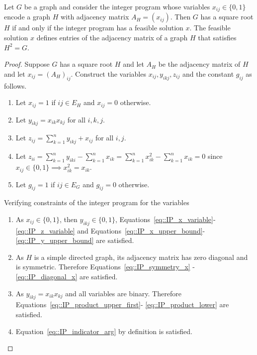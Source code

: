 
\begin{theorem} \label{theorem::IP_gives_root}
  Let $G$ be a graph and consider the integer program whose variables $x_{ij} \in \{0,1\}$ encode a graph $H$ with adjacency matrix $A_H = (x_{ij})$. Then $G$ has a square root $H$ if and only if the integer  program has a feasible solution $x$. The feasible solution $x$ defines entries of the adjacency matrix of a graph $H$ that satisfies $H^2 = G$.
\end{theorem}
\begin{proof}
  Suppose $G$ has a square root $H$ and let $A_H$ be the adjacency matrix of $H$ and let  $x_{ij} = (A_H)_{ij}$. Construct the variables $x_{ij}, y_{ikj}, z_{ij}$ and the constant $g_{ij}$ as follows.
  \begin{enumerate}[label=\roman*)]
    \item Let $x_{ij} = 1$ if $ij \in E_H$ and $x_{ij}=0$ otherwise. 
    \item Let $y_{ikj} = x_{ik}x_{kj}$ for all $i,k,j$. 
    \item Let $\displaystyle z_{ij} = \sum_{k = 1}^{n} y_{ikj} + x_{ij} $ for all $i,j$. 
    \item Let $\displaystyle z_{ii} = \sum_{k  = 1}^{n} y_{iki} - \sum_{k = 1}^{n} x_{ik} =  \sum_{k = 1}^{n} x_{ik}^2 -  \sum_{k = 1}^{n} x_{ik} = 0 $
    since $x_{ij} \in \{0 , 1\} \implies x_{ik}^2 = x_{ik}$. 
    \item Let $g_{ij} = 1$ if $ij \in E_G$ and $g_{ij}=0$ otherwise. 
  \end{enumerate}
  Verifying constraints of the integer program for the variables 
  \begin{enumerate}[label=\roman*)]
    \item As $x_{ij} \in \{0, 1 \}$, then $y_{ikj}  \in \{0, 1 \}$, Equations~\eqref{eq::IP_x_variable}-\eqref{eq::IP_z_variable}
    and Equations~\eqref{eq::IP_x_upper_bound}-\eqref{eq::IP_y_upper_bound} are satisfied.  
    \item As $H$ is a simple directed graph, its adjacency matrix has zero diagonal and is symmetric. Therefore Equations~\eqref{eq::IP_symmetry_x}
    -\eqref{eq::IP_diagonal_x} are satisfied.  
    \item As $y_{ikj} = x_{ik}x_{kj}$ and all variables are binary. Therefore Equations~\eqref{eq::IP_product_upper_first}-
    \eqref{eq::IP_product_lower} are satisfied. 
    \item Equation~\eqref{eq::IP_indicator_arg} by definition is satisfied. 

\end{enumerate}
\end{proof}
